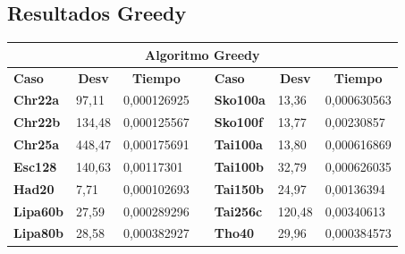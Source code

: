 \documentclass[a4paper, 12pt]{article}
\begin{document}
      \subsection{Resultados Greedy}
\begin{table}[H]
\centering
\label{my-label}
\begin{tabular}{|l|l|l|l|l|l|l|}
\hline
\multicolumn{7}{|c|}{\textbf{Algoritmo Greedy}}                                                                                                                                                \\ \hline
\textbf{Caso}    & \multicolumn{1}{c|}{\textbf{Desv}} & \multicolumn{1}{c|}{\textbf{Tiempo}} &  & \textbf{Caso}    & \multicolumn{1}{c|}{\textbf{Desv}} & \multicolumn{1}{c|}{\textbf{Tiempo}} \\ \cline{1-3} \cline{5-7} 
\textbf{Chr22a}  & 97,11                              & 0,000126925                          &  & \textbf{Sko100a} & 13,36                              & 0,000630563                          \\ \cline{1-3} \cline{5-7} 
\textbf{Chr22b}  & 134,48                             & 0,000125567                          &  & \textbf{Sko100f} & 13,77                              & 0,00230857                           \\ \cline{1-3} \cline{5-7} 
\textbf{Chr25a}  & 448,47                             & 0,000175691                          &  & \textbf{Tai100a} & 13,80                              & 0,000616869                          \\ \cline{1-3} \cline{5-7} 
\textbf{Esc128}  & 140,63                             & 0,00117301                           &  & \textbf{Tai100b} & 32,79                              & 0,000626035                          \\ \cline{1-3} \cline{5-7} 
\textbf{Had20}   & 7,71                               & 0,000102693                          &  & \textbf{Tai150b} & 24,97                              & 0,00136394                           \\ \cline{1-3} \cline{5-7} 
\textbf{Lipa60b} & 27,59                              & 0,000289296                          &  & \textbf{Tai256c} & 120,48                             & 0,00340613                           \\ \cline{1-3} \cline{5-7} 
\textbf{Lipa80b} & 28,58                              & 0,000382927                          &  & \textbf{Tho40}   & 29,96                              & 0,000384573                          \\ \cline{1-3} \cline{5-7} 

\end{tabular}
\end{table}
\end{document}
